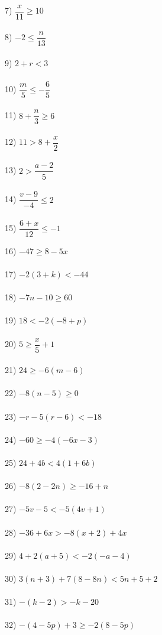 \documentclass[12pt]{article}
\theoremstyle{definition}
\begin{document}
\begin{multicols}{3}
  7) $\dfrac{x}{11} \geq 10$\\
\ \\
  8) $- 2 \leq \dfrac{n}{13}$\\
\ \\
  9) $2 + r < 3$\\
\ \\
  10) $\dfrac{m}{5} \leq - \dfrac{6}{5}$\\
\ \\
  11) $8 + \dfrac{n}{3} \geq 6$\\
\ \\
  12) $11 > 8 + \dfrac{x}{2}$\\
\ \\
  13) $2 > \dfrac{a - 2}{5}$\\
\ \\
  14) $\dfrac{v - 9}{- 4} \leq 2$\\
\ \\
  15) $\dfrac{6 + x}{12} \leq - 1$\\
\end{multicols}
\begin{multicols}{2}
  16) $- 47 \geq 8 - 5 x$\\ \ \\
  17) $- 2 (3 + k) < - 44$\\ \ \\
  18) $- 7 n - 10 \geq 60$\\ \ \\
  19) $18 < - 2 (- 8 + p)$\\ \ \\
  20) $5 \geq \dfrac{x}{5} + 1$\\ \ \\
  21) $24 \geq - 6 (m - 6)$\\ \ \\
	22) $- 8 (n - 5) \geq 0$\\ \ \\
  23) $- r - 5 (r - 6) < - 18$\\ \ \\
  24) $- 60 \geq - 4 (- 6 x - 3)$\\ \ \\
	25) $24 + 4 b < 4 (1 + 6 b)$\\ \ \\
  26) $- 8 (2 - 2 n) \geq - 16 + n$\\ \ \\
  27) $- 5 v - 5 < - 5 (4 v + 1)$\\ \ \\
  28) $- 36 + 6 x > - 8 (x + 2) + 4 x$\\ \ \\
  29) $4 + 2 (a + 5) < - 2 (- a - 4)$\\ \ \\
  30) $3 (n + 3) + 7 (8 - 8 n) < 5 n + 5 + 2$\\ \ \\
  31) $- (k - 2) > - k - 20$\\ \ \\
  32) $- (4 - 5 p) + 3 \geq - 2 (8 - 5 p)$\\
\ \\
\end{multicols}
\newpage
\end{document}
